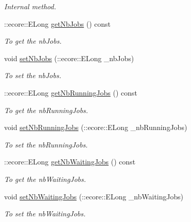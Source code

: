 \begin{DoxyCompactItemize}
\begin{DoxyCompactList}\small\item\em Internal method. \item\end{DoxyCompactList}\item 
::ecore::ELong \hyperlink{classTMS__Data_1_1ListJobs_a78b79df263ddde1cde332878bb867700}{getNbJobs} () const 
\begin{DoxyCompactList}\small\item\em To get the nbJobs. \item\end{DoxyCompactList}\item 
void \hyperlink{classTMS__Data_1_1ListJobs_a5e199990aa16139fb13bd43ae255760d}{setNbJobs} (::ecore::ELong \_\-nbJobs)
\begin{DoxyCompactList}\small\item\em To set the nbJobs. \item\end{DoxyCompactList}\item 
::ecore::ELong \hyperlink{classTMS__Data_1_1ListJobs_a604c95a2ccbd7ad52b9a18a1f2390632}{getNbRunningJobs} () const 
\begin{DoxyCompactList}\small\item\em To get the nbRunningJobs. \item\end{DoxyCompactList}\item 
void \hyperlink{classTMS__Data_1_1ListJobs_aac47866ad1efaf2697cca311a108c5ba}{setNbRunningJobs} (::ecore::ELong \_\-nbRunningJobs)
\begin{DoxyCompactList}\small\item\em To set the nbRunningJobs. \item\end{DoxyCompactList}\item 
::ecore::ELong \hyperlink{classTMS__Data_1_1ListJobs_a7196d02655e817d8e56f582a12ab48d2}{getNbWaitingJobs} () const 
\begin{DoxyCompactList}\small\item\em To get the nbWaitingJobs. \item\end{DoxyCompactList}\item 
void \hyperlink{classTMS__Data_1_1ListJobs_a9b77032f7e0be2b337f2790b45cc9d61}{setNbWaitingJobs} (::ecore::ELong \_\-nbWaitingJobs)
\begin{DoxyCompactList}\small\item\em To set the nbWaitingJobs. \item\end{DoxyCompactList}\item 

\end{DoxyCompactItemize}
